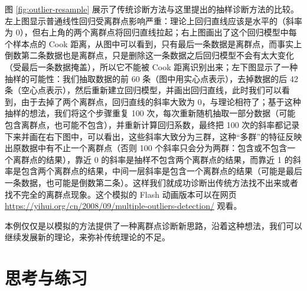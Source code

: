 \documentclass[
  b5paper,
  UTF8,twoside]{book}
\begin{document}
图 \ref{fig:outlier-resample} 展示了传统诊断方法与这里提出的抽样诊断方法的比较。左上图显示普通线性回归受离群点影响严重：理论上回归直线应该是水平的（斜率为 0），但右上角的两个离群点将回归直线拉起；右上图画出了这个回归模型中每个样本点的 Cook 距离，从图中可以看到，只有最后一条数据是离群点，而事实上倒数第二条数据也是离群点，只是删除这一条数据之后回归模型不会有太大变化（受最后一条数据掩盖），所以它不能被 Cook 距离识别出来；左下图显示了一种抽样的可能性：我们抽取数据的前 60 条（图中用实心点表示），去掉数据的后 42 条（空心点表示），然后重新建立回归模型，并画出回归直线，此时我们可以看到，由于去掉了两个离群点，回归直线的斜率大致为 0，与理论相符了；基于这种抽样的想法，我们将这个步骤重复 100 次，每次重新随机抽取一部分数据（可能包含离群点，也可能不包含），并重新计算回归系数，最终把 100 次的斜率都记录下来并画在右下图中，可以看出，这些斜率大致分为三群，这种``多群''的特征反映出原数据中有不止一个离群点（否则 100 个斜率只会分为两群：包含或不包含一个离群点的结果），靠近 0 的斜率是抽样不包含两个离群点的结果，而靠近 1 的斜率是包含两个离群点的结果，中间一层斜率是包含一个离群点的结果（可能是最后一条数据，也可能是倒数第二条）。这样我们就成功诊断出传统方法找不出来或者找不完全的离群点现象。这个模拟的 Flash 动画版本可以在网页 \url{https://yihui.org/cn/2008/09/multiple-outliers-detection/} 观看。

本例仅仅是以模拟的方法提供了一种离群点诊断新思路，沿着这种想法，我们可以继续发展新的理论，来弥补传统理论的不足。

\section{思考与练习}\label{ux601dux8003ux4e0eux7ec3ux4e60-5}
\end{document}
